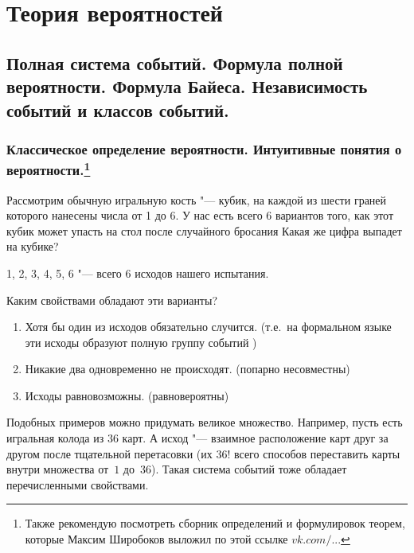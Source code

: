 \part{Теория вероятностей}

\chapter{Полная система событий. Формула полной вероятности. Формула Байеса. Независимость событий и классов событий.}

\section[Классическое определение вероятности. Интуитивные понятия о вероятности.]{Классическое определение вероятности. Интуитивные понятия о вероятности.\protect\footnote{Также рекомендую посмотреть сборник определений и формулировок теорем, которые Максим Широбоков выложил по этой ссылке \href{https://vk.com/wall5284431_976}{$vk.com/...$}}}

Рассмотрим обычную игральную кость "--- кубик, на каждой из шести граней которого нанесены числа от 1 до 6. У нас есть всего 6 вариантов того, как этот кубик может упасть на стол после случайного бросания Какая же цифра выпадет на кубике? 
\begin{center}
1, 2, 3, 4, 5, 6 "--- всего 6 исходов нашего испытания.
\end{center}
Каким свойствами обладают эти варианты?
\begin{enumerate}
\item Хотя бы один из исходов обязательно случится. (т.е.~на формальном языке эти исходы образуют полную группу событий )
\item Никакие два одновременно не происходят. (попарно несовместны)
\item Исходы равновозможны. (равновероятны)
\end{enumerate}

Подобных примеров можно придумать великое множество. Например, пусть есть игральная колода из $36$ карт. А исход "--- взаимное расположение карт друг за другом после тщательной перетасовки (их $36!$ всего способов переставить карты внутри множества от~$1$ до~$36$). Такая система событий тоже обладает перечисленными свойствами.


